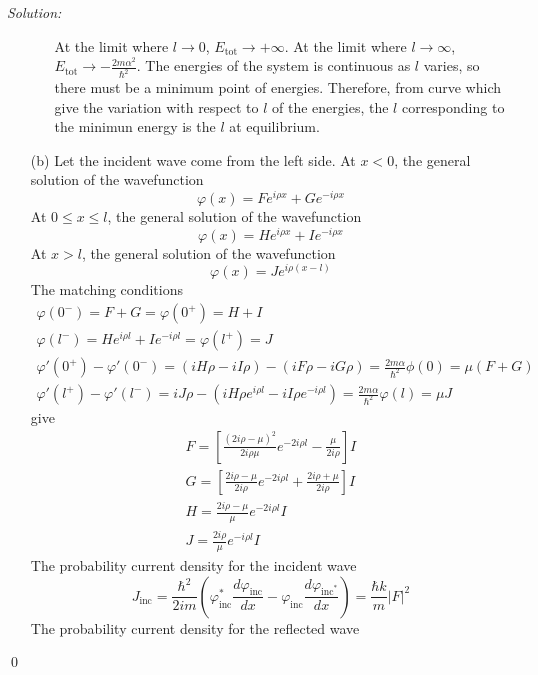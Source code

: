 \documentclass[12pt,a4paper]{article}
\newenvironment{sol}
    {\emph{Solution:}
    }
    {
    \qed
    }
\begin{document}
\begin{sol}
\begin{itemize}
\begin{itemize}
At the limit where $l\rightarrow0$, $E_{\text{tot}}\rightarrow+\infty$. At the limit where $l\rightarrow\infty$, $E_{\text{tot}}\rightarrow-\frac{2m\alpha^2}{\hbar^2}$. The energies of the system is continuous as $l$ varies, so there must be a minimum point of energies. Therefore, from curve which give the variation with respect to $l$ of the energies, the $l$ corresponding to the minimun energy is the $l$ at equilibrium.
\end{itemize}
\item[(b)] Let the incident wave come from the left side. At $x<0$, the general solution of the wavefunction
\begin{equation}
\varphi(x)=Fe^{i\rho x}+Ge^{-i\rho x}
\end{equation}
At $0\leq x\leq l$, the general solution of the wavefunction
\begin{equation}
\varphi(x)=He^{i\rho x}+Ie^{-i\rho x}
\end{equation}
At $x>l$, the general solution of the wavefunction
\begin{equation}
\varphi(x)=Je^{i\rho(x-l)}
\end{equation}
The matching conditions
\begin{gather}
\varphi(0^-)=F+G=\varphi(0^+)=H+I\\
\varphi(l^-)=He^{i\rho l}+Ie^{-i\rho l}=\varphi(l^+)=J\\
\varphi'(0^+)-\varphi'(0^-)=(iH\rho-iI\rho)-(iF\rho-iG\rho)=\frac{2m\alpha}{\hbar^2}\phi(0)=\mu(F+G)\\
\varphi'(l^+)-\varphi'(l^-)=iJ\rho-(iH\rho e^{i\rho l}-iI\rho e^{-i\rho l})=\frac{2m\alpha}{\hbar^2}\varphi(l)=\mu J
\end{gather}
give
\begin{gather}
F=\left[\frac{(2i\rho-\mu)^2}{2i\rho\mu}e^{-2i\rho l}-\frac{\mu}{2i\rho}\right]I\\
G=\left[\frac{2i\rho-\mu}{2i\rho}e^{-2i\rho l}+\frac{2i\rho+\mu}{2i\rho}\right]I\\
H=\frac{2i\rho-\mu}{\mu}e^{-2i\rho l}I\\
J=\frac{2i\rho}{\mu}e^{-i\rho l}I
\end{gather}
The probability current density for the incident wave
\begin{equation}
J_{\text{inc}}=\frac{\hbar^2}{2im}(\varphi_{\text{inc}}^*\frac{d\varphi_{\text{inc}}}{dx}-\varphi_{\text{inc}}\frac{d\varphi_{\text{inc}^*}}{dx})=\frac{\hbar k}{m}|F|^2
\end{equation}
The probability current density for the reflected wave

\end{itemize}
\end{sol}
\end{document}
